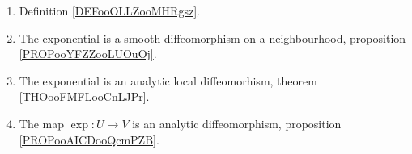 
\begin{enumerate}
	\item
	      Definition \ref{DEFooOLLZooMHRgsz}.
	\item
	      The exponential is a smooth diffeomorphism on a neighbourhood, proposition \ref{PROPooYFZZooLUOuOj}.
	\item
	      The exponential is an analytic local diffeomorhism, theorem \ref{THOooFMFLooCnLJPr}.
	\item
	      The map \( \exp\colon U\to V\) is an analytic diffeomorphism, proposition \ref{PROPooAICDooQcmPZB}.
\end{enumerate}
